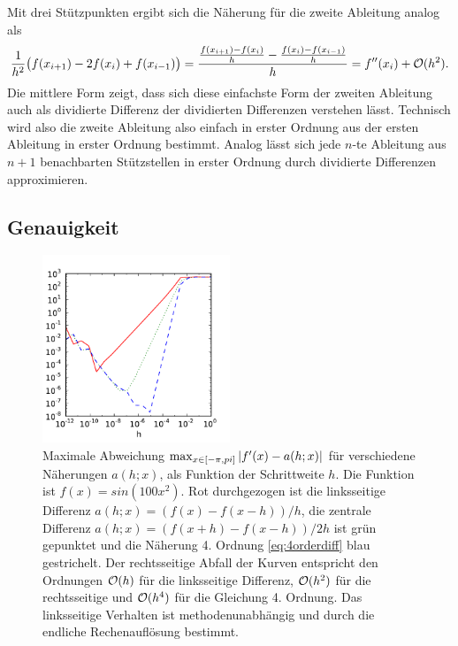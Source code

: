 Mit drei Stützpunkten ergibt sich die Näherung für die zweite
Ableitung analog als
\begin{multline}
  \label{eq:1order2diff}
  \frac{1}{h^2}\bigl(f(x_{i+1}) -
  2f(x_i)  + f(x_{i-1})\bigr) =
  \frac{\frac{f(x_{i+1}) - f(x_i)}{h}  -
    \frac{f(x_i) - f(x_{i-1})}{h}}{h}
  = f''(x_i) + \mathcal O(h^2).
\end{multline}
Die mittlere Form zeigt, dass sich diese einfachste Form der zweiten
Ableitung auch als dividierte Differenz der dividierten Differenzen
verstehen lässt. Technisch wird also die zweite Ableitung also einfach
in erster Ordnung aus der ersten Ableitung in erster Ordnung
bestimmt. Analog lässt sich jede $n$-te Ableitung aus $n+1$
benachbarten Stützstellen in erster Ordnung durch dividierte
Differenzen approximieren.

\subsection{Genauigkeit}

\begin{figure}
  \centering
  \includegraphics[width=0.5\textwidth]{plots/num_diff}
  \caption{Maximale Abweichung $\max_{x\in[-\pi,pi]} \left\lvert{f'(x) - a(h;
      x)}\right\rvert$ für verschiedene Näherungen $a(h; x)$, als Funktion der
    Schrittweite $h$. Die Funktion ist $f(x)=sin(100x^2)$. Rot
    durchgezogen ist die linksseitige Differenz $a(h; x) = (f(x) -
    f(x-h))/h$, die zentrale Differenz $a(h; x) = (f(x+h) -
    f(x-h))/2h$ ist grün gepunktet und die Näherung 4. Ordnung
    \eqref{eq:4orderdiff} blau gestrichelt. Der rechtsseitige Abfall
    der Kurven entspricht den Ordnungen $\mathcal O(h)$ für die linksseitige
    Differenz, $\mathcal O(h^2)$ für die rechtsseitige und $\mathcal O(h^4)$ für die
    Gleichung 4. Ordnung. Das linksseitige Verhalten ist
    methodenunabhängig und durch die endliche Rechenauflösung bestimmt.}
  \label{fig:num_diff}
\end{figure}

